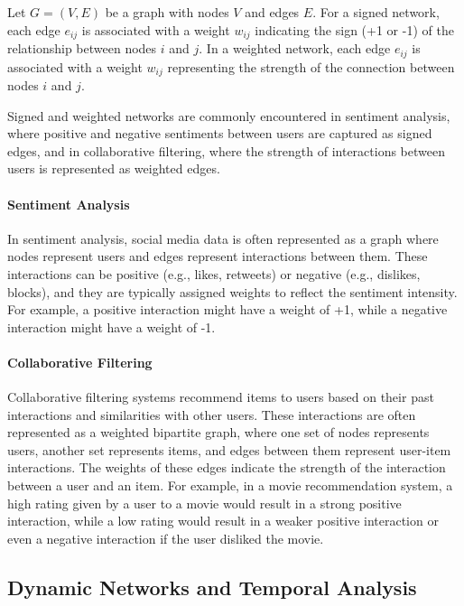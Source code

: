 \documentclass[12pt]{book} %
\begin{document}
Let \(G = (V, E)\) be a graph with nodes \(V\) and edges \(E\). For a signed network, each edge \(e_{ij}\) is associated with a weight \(w_{ij}\) indicating the sign (+1 or -1) of the relationship between nodes \(i\) and \(j\). In a weighted network, each edge \(e_{ij}\) is associated with a weight \(w_{ij}\) representing the strength of the connection between nodes \(i\) and \(j\).

Signed and weighted networks are commonly encountered in sentiment analysis, where positive and negative sentiments between users are captured as signed edges, and in collaborative filtering, where the strength of interactions between users is represented as weighted edges.

\paragraph{Sentiment Analysis} 

In sentiment analysis, social media data is often represented as a graph where nodes represent users and edges represent interactions between them. These interactions can be positive (e.g., likes, retweets) or negative (e.g., dislikes, blocks), and they are typically assigned weights to reflect the sentiment intensity. For example, a positive interaction might have a weight of +1, while a negative interaction might have a weight of -1. 

\paragraph{Collaborative Filtering}

Collaborative filtering systems recommend items to users based on their past interactions and similarities with other users. These interactions are often represented as a weighted bipartite graph, where one set of nodes represents users, another set represents items, and edges between them represent user-item interactions. The weights of these edges indicate the strength of the interaction between a user and an item. For example, in a movie recommendation system, a high rating given by a user to a movie would result in a strong positive interaction, while a low rating would result in a weaker positive interaction or even a negative interaction if the user disliked the movie.


\subsection{Dynamic Networks and Temporal Analysis}
\end{document}
